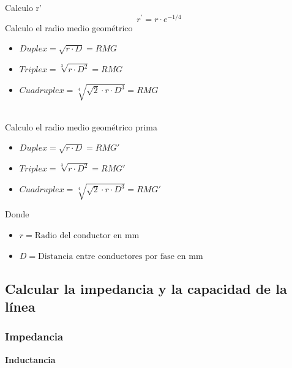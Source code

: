 \documentclass[10pt,a4paper]{article}
\begin{document}
Calculo r'
$$
r^{\prime}=r \cdot e^{-1 / 4}
$$
Calculo el radio medio geométrico
\begin{itemize}
    \item $Duplex = \sqrt{r \cdot D} = RMG$
    \item $Triplex = \sqrt[3]{r \cdot D^2} = RMG$
    \item $Cuadruplex = \sqrt[4]{\sqrt{2} \cdot r \cdot D^3} = RMG$
\end{itemize}
\\
Calculo el radio medio geométrico prima
\begin{itemize}
    \item $Duplex = \sqrt{r \cdot D} = RMG'$
    \item $Triplex = \sqrt[3]{r \cdot D^2} = RMG'$
    \item $Cuadruplex = \sqrt[4]{\sqrt{2} \cdot r \cdot D^3} = RMG'$
\end{itemize}
Donde
\begin{itemize}
    \item $r = \text{Radio del conductor en mm}$
    \item $D = \text{Distancia entre conductores por fase en mm}$
\end{itemize}
\newpage
\subsection{Calcular la impedancia y la capacidad de la línea}
\subsubsection{Impedancia}
\textbf{Inductancia}
\\
\end{document}
